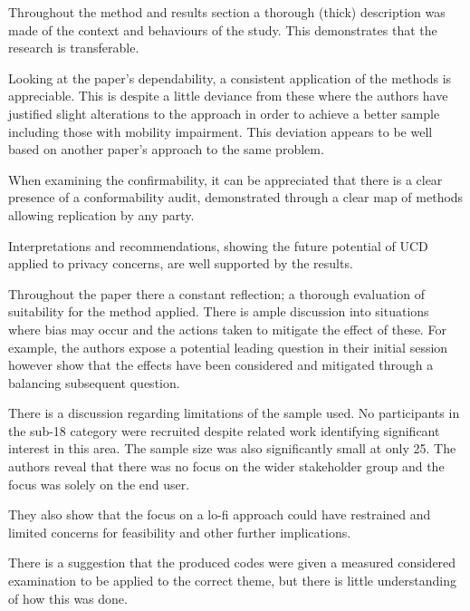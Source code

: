 
Throughout the method and results section a thorough (thick) description was made of the context and behaviours of the study. This demonstrates that the research is transferable.


Looking at the paper's dependability, a consistent application of the methods is appreciable. This is despite a little deviance from these where the authors have justified slight alterations to the approach in order to achieve a better sample including those with mobility impairment. This deviation appears to be well based on another paper's approach to the same problem.


When examining the confirmability, it can be appreciated that there is a clear presence of a conformability audit, demonstrated through a clear map of methods allowing replication by any party.  

Interpretations and recommendations, showing the future potential of UCD applied to privacy concerns, are well supported by the results.  

Throughout the paper there a constant reflection; a thorough evaluation of suitability for the method applied. There is ample discussion into situations where bias may occur and the actions taken to mitigate the effect of these. For example, the authors expose a potential leading question in their initial session however show that the effects have been considered and mitigated through a balancing subsequent question. 

There is a discussion regarding limitations of the sample used. No participants in the sub-18 category were recruited despite related work identifying significant interest in this area. The sample size was also significantly small at only 25. The authors reveal that there was no focus on the wider stakeholder group and the focus was solely on the end user. 

They also show that the focus on a lo-fi approach could have restrained and limited concerns for feasibility and other further implications.

There is a suggestion that the produced codes were given a measured considered examination to be applied to the correct theme, but there is little understanding of how this was done.

\newpage